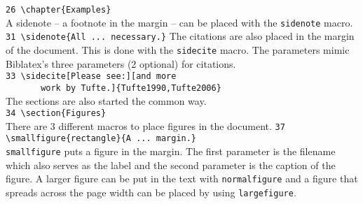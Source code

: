 \documentclass[]{caesar_book}
\begin{document}
\verb+26 \chapter{Examples}+\\
A sidenote – a footnote in the margin – can be placed with the \texttt{sidenote} macro.\\
\verb+31 \sidenote{All ... necessary.}+
The citations are also placed in the margin of the document. This is done with the \texttt{sidecite} macro. The parameters mimic Biblatex's three parameters (2 optional) for citations.\\
\verb+33 \sidecite[Please see:][and more +\\
\verb+       work by Tufte.]{Tufte1990,Tufte2006}+\\
The sections are also started the common way.\\
\verb+34 \section{Figures}+\\
There are 3 different macros to place figures in the document.
\verb+37 \smallfigure{rectangle}{A ... margin.}+\\
\texttt{smallfigure} puts a figure in the margin. The first parameter is the filename which also serves as the label and the second parameter is the caption of the figure. A larger figure can be put in the text with \texttt{normalfigure} and a figure that spreads across the page width can be placed by using \texttt{largefigure}.
\end{document}
